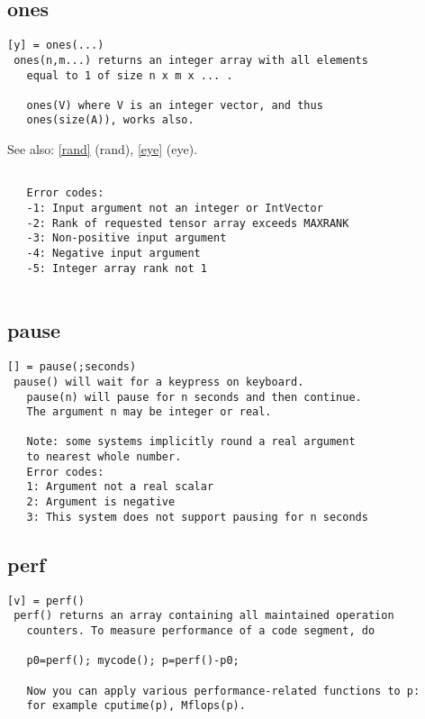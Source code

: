 \documentclass[a4paper]{article}
\begin{document}
\subsection{ones\label{ones}}

\begin{tscreen}
\begin{verbatim}
[y] = ones(...)
 ones(n,m...) returns an integer array with all elements
   equal to 1 of size n x m x ... .

   ones(V) where V is an integer vector, and thus
   ones(size(A)), works also.
\end{verbatim}

See also: \ref{rand} {(rand)}, \ref{eye} {(eye)}.
\begin{verbatim}
   
   Error codes:
   -1: Input argument not an integer or IntVector
   -2: Rank of requested tensor array exceeds MAXRANK
   -3: Non-positive input argument
   -4: Negative input argument
   -5: Integer array rank not 1
   
\end{verbatim}
\end{tscreen}



\subsection{pause\label{pause}}

\begin{tscreen}
\begin{verbatim}
[] = pause(;seconds)
 pause() will wait for a keypress on keyboard.
   pause(n) will pause for n seconds and then continue.
   The argument n may be integer or real.

   Note: some systems implicitly round a real argument
   to nearest whole number.
   Error codes:
   1: Argument not a real scalar
   2: Argument is negative
   3: This system does not support pausing for n seconds 
\end{verbatim}
\end{tscreen}



\subsection{perf\label{perf}}

\begin{tscreen}
\begin{verbatim}
[v] = perf()
 perf() returns an array containing all maintained operation
   counters. To measure performance of a code segment, do

   p0=perf(); mycode(); p=perf()-p0;

   Now you can apply various performance-related functions to p:
   for example cputime(p), Mflops(p). 
\end{verbatim}
\end{tscreen}
\end{document}
